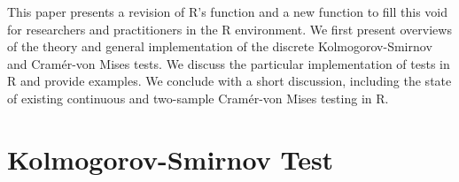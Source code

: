 This paper presents a revision of R's
 function and a new  function to
fill this void for researchers and practitioners in the R environment. 
We first present overviews of the theory and general implementation of the
discrete Kolmogorov-Smirnov and Cram\'{e}r-von Mises tests.  We discuss
the particular implementation of tests in R and provide examples.  We
conclude with a short discussion, including the state of existing continuous
and two-sample Cram\'{e}r-von Mises testing in R.





\section{Kolmogorov-Smirnov Test}

